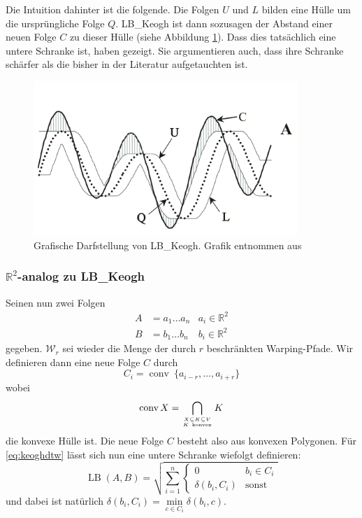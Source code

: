 Die Intuition dahinter ist die folgende. Die Folgen $U$ und $L$ bilden eine Hülle um die ursprüngliche Folge $Q$. LB\_Keogh ist dann sozusagen der Abstand einer neuen Folge $C$ zu dieser Hülle (siehe Abbildung \ref{fig:lb_keogh}). Dass dies tatsächlich eine untere Schranke ist, haben \citet{Keogh:2005p7751} gezeigt. Sie argumentieren auch, dass ihre Schranke schärfer als die bisher in der Literatur aufgetauchten ist.

\begin{figure}
  \centering \includegraphics[width=10cm]{figures/lb-keogh.png}
  \caption{Grafische Darfstellung von LB\_Keogh. Grafik entnommen aus \cite{Keogh:2005p7751}}
  \label{fig:lb_keogh}
\end{figure}

\subsubsection{\(\mathbb{R}^2\)-analog zu LB\_Keogh}\label{subs:lb_keogh_analog}

Seinen nun zwei Folgen
\begin{align}
  A &= a_1 \dots a_n  & a_i \in \mathbb{R}^2 \\
  B &= b_1 \dots b_n  & b_i \in \mathbb{R}^2
\end{align}
gegeben.
\( \mathcal{W}_r \) sei wieder die Menge der durch \(r\) beschränkten Warping-Pfade. Wir definieren dann eine neue Folge $C$ durch
\begin{equation}
  C_i = \operatorname{conv} ~\{ a_{i-r}, \dots, a_{i+r} \}
\end{equation}
wobei
\[
  \operatorname{conv} X = \bigcap_{X\subseteq K \subseteq V \atop K\ \mathrm{konvex}} K
\]
die konvexe Hülle ist. Die neue Folge $C$ besteht also aus konvexen Polygonen. Für \ref{eq:keoghdtw} lässt sich nun eine untere Schranke wiefolgt definieren:
\begin{equation}
  \label{eq:lbkeoghanalog}
  \operatorname{LB}(A,B) = \sqrt{\sum_{i=1}^n
  \begin{cases}
    0 & b_i \in C_i \\
    \delta(b_i, C_i) & \text{sonst}
  \end{cases}
  }
\end{equation}
und dabei ist natürlich \( \delta(b_i, C_i) = \min\limits_{c \in C_i} \delta(b_i, c) \).

